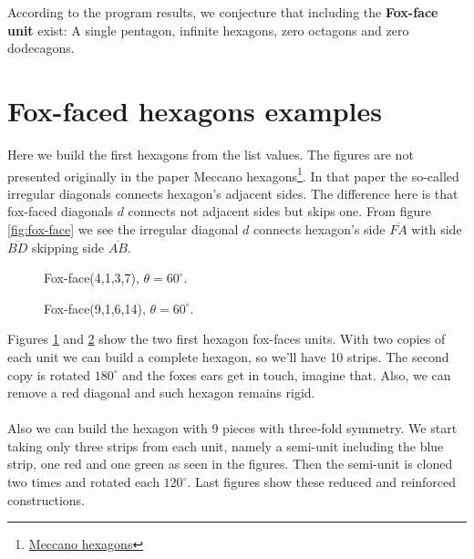 \documentclass[11pt]{article}
\begin{document}
According to the program results, we conjecture that including the \textbf{Fox-face unit} exist: A single pentagon, infinite hexagons, zero octagons and zero dodecagons. 

\section{Fox-faced hexagons examples}

Here we build the first hexagons from the list values. The figures are not presented originally in the paper
Meccano hexagons\footnote{
\href{https://github.com/heptagons/meccano/tree/main/hexa/hexagons.pdf}{Meccano hexagons}	
}. In that paper the so-called irregular diagonals connects hexagon's adjacent sides. 
The difference here is that fox-faced diagonals $d$ connects not adjacent sides but skips one. 
From figure \ref{fig:fox-face} we see the irregular diagonal $d$ connects hexagon's side $\overline{FA}$
with side $\overline{BD}$ skipping side $\overline{AB}$.

\setlength{\columnsep}{10pt}
\begin{multicols}{1}
\begin{figure}[H]
\centering
{}
\caption{Fox-face(4,1,3,7), $\theta=60^\circ$.}
\label{fig:4-1-3-7}
\end{figure}

\begin{figure}[H]
\centering
{}
\caption{Fox-face(9,1,6,14), $\theta=60^\circ$.}
\label{fig:9-1-6-14}
\end{figure}
\end{multicols}

Figures \ref{fig:4-1-3-7} and \ref{fig:9-1-6-14} show the two first hexagon fox-faces units. With 
two copies of each unit we can build a complete hexagon, so we'll have 10 strips. The second copy
is rotated $180^\circ$ and the foxes ears get in touch, imagine that. Also, we can remove a
red diagonal and such hexagon remains rigid.
\\\\
Also we can build the hexagon with 9 pieces with three-fold symmetry.
We start taking only three strips from each unit,
namely a semi-unit including the blue strip, one red and one green as seen in the figures.
Then the semi-unit is cloned two times and rotated each $120^\circ$.
Last figures show these reduced and reinforced constructions.
\end{document}
